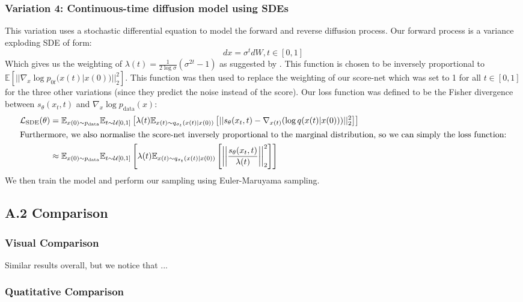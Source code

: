 \subsubsection{Variation 4: Continuous-time diffusion model using SDEs}

This variation uses a stochastic differential equation to model the forward and reverse diffusion process. 
Our forward process is a variance exploding SDE of form:
\begin{equation}
  dx = \sigma ^ t dW, t \in [0, 1]
\end{equation}
Which gives us the weighting of
$\lambda(t) = \frac{1}{2 \log \sigma} (\sigma^{2t}-1)$ as suggested by \cite{yang_song}.
This function is chosen to be inversely proportional to $\mathbb{E}[||\nabla_x \log p_{0t}(x(t) | x(0))||^2_2]$.
This function was then used to replace the weighting of our score-net
which was set to 1 for all $t \in [0, 1]$ for the three other variations (since they predict the noise instead of the score).
Our loss function was defined to be the Fisher divergence between $s_\theta(x_t, t)$ and $\nabla_x \log p_{\text{data}}(x)$:
\begin{align}
  \mathcal{L}_\text{SDE}(\theta) &= \mathbb{E}_{x(0) \sim p_\text{data}} \mathbb{E}_{t \sim \mathcal{U}[0, 1]} \left[ 
  \lambda(t) \mathbb{E}_{x(t) \sim q_{\sigma_t}(x(t) | x(0))} \left[
    ||s_\theta (x_t, t) - \nabla_{x(t)} (\log q(x(t) | x(0)))||^2_2
    \right]\right]\\
  \intertext{Furthermore, we also normalise the score-net
  inversely proportional to the marginal distribution, so we can simply the loss function:}
    &\approx \mathbb{E}_{x(0) \sim p_\text{data}} \mathbb{E}_{t \sim \mathcal{U}[0, 1]} \left[ 
  \lambda(t) \mathbb{E}_{x(t) \sim q_{\sigma_t}(x(t) | x(0))} \left[
    \left|\left|\frac{s_\theta(x_t, t)}{\lambda(t)}\right|\right|^2_2
    \right]\right]
\end{align}
We then train the model and perform our sampling using Euler-Maruyama sampling.

\subsection{A.2 Comparison}

\subsubsection{Visual Comparison}



Similar results overall, but we notice that ...



\subsubsection{Quatitative Comparison}
